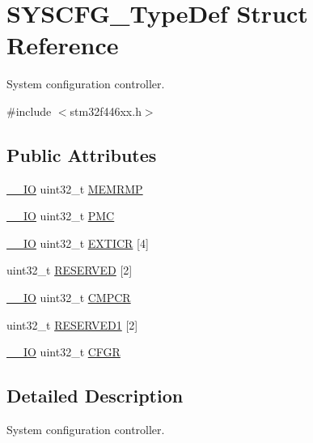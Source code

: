 \hypertarget{struct_s_y_s_c_f_g___type_def}{}\section{S\+Y\+S\+C\+F\+G\+\_\+\+Type\+Def Struct Reference}
\label{struct_s_y_s_c_f_g___type_def}


System configuration controller.  




{\ttfamily \#include $<$stm32f446xx.\+h$>$}

\subsection*{Public Attributes}
\begin{DoxyCompactItemize}
\item 
\hyperlink{core__sc300_8h_aec43007d9998a0a0e01faede4133d6be}{\+\_\+\+\_\+\+IO} uint32\+\_\+t \hyperlink{struct_s_y_s_c_f_g___type_def_a85b9d3df2274b730327b181c402a7bf5}{M\+E\+M\+R\+MP}
\item 
\hyperlink{core__sc300_8h_aec43007d9998a0a0e01faede4133d6be}{\+\_\+\+\_\+\+IO} uint32\+\_\+t \hyperlink{struct_s_y_s_c_f_g___type_def_ab5c47c570566cb8ff9d0436c17cc9241}{P\+MC}
\item 
\hyperlink{core__sc300_8h_aec43007d9998a0a0e01faede4133d6be}{\+\_\+\+\_\+\+IO} uint32\+\_\+t \hyperlink{struct_s_y_s_c_f_g___type_def_a66a06b3aab7ff5c8fa342f7c1994bf7d}{E\+X\+T\+I\+CR} \mbox{[}4\mbox{]}
\item 
uint32\+\_\+t \hyperlink{struct_s_y_s_c_f_g___type_def_a43926e6d31a976a0018b2d1f5c92645d}{R\+E\+S\+E\+R\+V\+ED} \mbox{[}2\mbox{]}
\item 
\hyperlink{core__sc300_8h_aec43007d9998a0a0e01faede4133d6be}{\+\_\+\+\_\+\+IO} uint32\+\_\+t \hyperlink{struct_s_y_s_c_f_g___type_def_ada13497abc6402300570ff5f430a612e}{C\+M\+P\+CR}
\item 
uint32\+\_\+t \hyperlink{struct_s_y_s_c_f_g___type_def_a864cf277b7d9c9069372607501b47ad6}{R\+E\+S\+E\+R\+V\+E\+D1} \mbox{[}2\mbox{]}
\item 
\hyperlink{core__sc300_8h_aec43007d9998a0a0e01faede4133d6be}{\+\_\+\+\_\+\+IO} uint32\+\_\+t \hyperlink{struct_s_y_s_c_f_g___type_def_af9e58364169ac3d84d12f9e4aabf1f62}{C\+F\+GR}
\end{DoxyCompactItemize}


\subsection{Detailed Description}
System configuration controller. 

